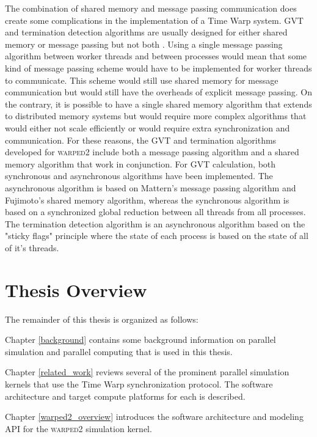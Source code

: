\documentclass[11pt]{book}
\begin{document}
The combination of shared memory and message passing communication does create some complications
in the implementation of a Time Warp system.  GVT and termination detection algorithms are
usually designed for either shared memory or message passing but not both
\cite{mattern-93,bellenot-90,fujimoto-94,xaio-95}.  Using a single message passing algorithm
between worker threads and between processes would mean that some kind of message passing scheme
would have to be implemented for worker threads to communicate.  This scheme would still use
shared memory for message communication but would still have the overheads of explicit message
passing.  On the contrary, it is possible to have a single shared memory algorithm that
extends to distributed memory systems but would require more complex algorithms that would
either not scale efficiently or would require extra synchronization and communication.  For
these reasons, the GVT and termination algorithms developed for \textsc{warped2} include both
a message passing algorithm and a shared memory algorithm that work in conjunction.  For GVT
calculation, both synchronous and asynchronous algorithms have been implemented.  The asynchronous
algorithm is based on Mattern's message passing algorithm\cite{mattern-93} and Fujimoto's shared
memory algorithm\cite{fujimoto-94}, whereas the synchronous algorithm is based on a synchronized
global reduction between all threads from all processes.  The termination detection algorithm
is an asynchronous algorithm based on the "sticky flags" principle\cite{mattern-91} where the
state of each process is based on the state of all of it's threads.

\section{Thesis Overview}

The remainder of this thesis is organized as follows:

Chapter \ref{background} contains some background information on parallel simulation and
parallel computing that is used in this thesis.

Chapter \ref{related_work} reviews several of the prominent parallel simulation kernels
that use the Time Warp synchronization protocol.  The software architecture and target
compute platforms for each is described.

Chapter \ref{warped2_overview} introduces the software architecture and modeling API for
the \textsc{warped2} simulation kernel.
\end{document}
